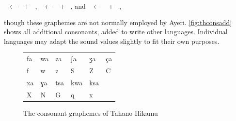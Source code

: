 \pex
	\a {}~ ← ~ + ~, 
	\a {}~ ← ~ + ~, and 
	\a {}~ ← ~ + ~,
\xe

\noindent though these graphemes are not normally employed by Ayeri. 
\autoref{fig:thconsadd} shows all additional consonants, added to write other 
languages. Individual languages may adapt the sound values slightly to fit their 
own purposes.

\begin{figure}[ht]
\caption{The consonant graphemes of Tahano Hikamu}

\begin{tabu} to \linewidth{X[c] X[c] X[c] X[c] X[c] X[c]}
\toprule
\tableheaderfont	fa & wa & za & ʃa & ʒa & ça \\
\rowfont{\Tagati\huge}	f & w & z & S & Z & C \\

\midrule

\tableheaderfont	xa & ɣa & tsa & kwa & ksa \\
\rowfont{\Tagati\huge}	X & N & G & q & x \\

\bottomrule
\end{tabu}
\label{fig:thconsadd}
\end{figure}
